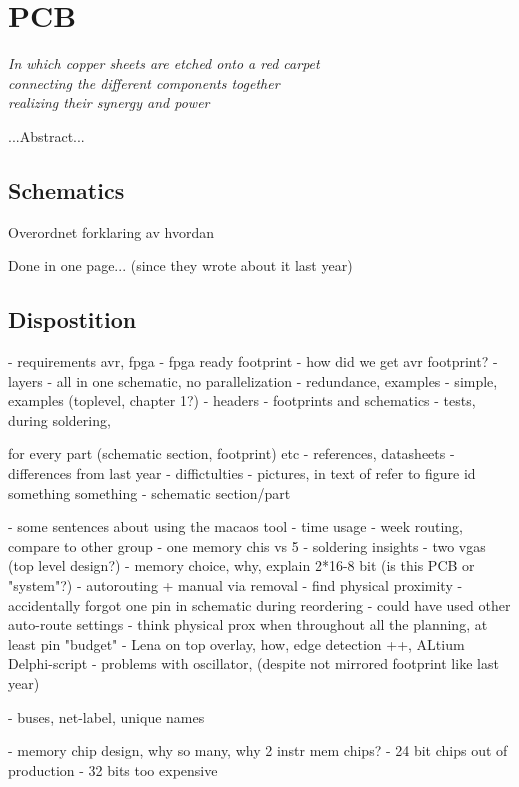 \chapter {PCB}

\begin{flushright}{\slshape
    In which copper sheets are etched onto a red carpet\\
    connecting the different components together\\
    realizing their synergy and power
}
\end{flushright}
...Abstract...

\section {Schematics}

Overordnet forklaring av hvordan

Done in one page... (since they wrote about it last year)

\section {Dispostition}
- requirements avr, fpga
	- fpga ready footprint
	- how did we get avr footprint?
- layers
- all in one schematic, no parallelization
- redundance, examples
- simple, examples (toplevel, chapter 1?)
- headers
- footprints and schematics
- tests, during soldering, 

for every part (schematic section, footprint) etc
	- references, datasheets
	- differences from last year
	- diffictulties
	- pictures, in text of refer to figure id something something
	- schematic section/part

- some sentences about using the macaos tool
- time usage
	- week routing, compare to other group
	- one memory chis vs 5
- soldering insights
- two vgas (top level design?)
- memory choice, why, explain 2*16-8 bit (is this PCB or "system"?)
- autorouting + manual via removal
	- find physical proximity
	- accidentally forgot one pin in schematic during reordering
	- could have used other auto-route settings
	- think physical prox when throughout all the planning, at least pin "budget"
- Lena on top overlay, how, edge detection ++, ALtium Delphi-script
- problems with oscillator, (despite not mirrored footprint like last year)

- buses, net-label, unique names

- memory chip design, why so many, why 2 instr mem chips?
	- 24 bit chips out of production
	- 32 bits too expensive


